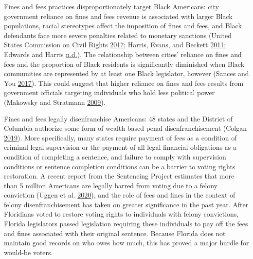 \documentclass[
  12pt,
]{article}
\begin{document}
Fines and fees practices disproportionately target Black Americans: city government reliance on fines and fees revenue is associated with larger Black populations, racial stereotypes affect the imposition of fines and fees, and Black defendants face more severe penalties related to monetary sanctions (United States Commission on Civil Rights \protect\hyperlink{ref-UnitedStatesCommissiononCivilRights2017}{2017}; Harris, Evans, and Beckett \protect\hyperlink{ref-Harris2011}{2011}; Edwards and Harris \protect\hyperlink{ref-Edwards2020}{n.d.}). The relationship between cities' reliance on fines and fees and the proportion of Black residents is significantly diminished when Black communities are represented by at least one Black legislator, however (Sances and You \protect\hyperlink{ref-Sances2017}{2017}). This could suggest that higher reliance on fines and fees results from government officials targeting individuals who hold less political power (Makowsky and Stratmann \protect\hyperlink{ref-Makowsky2009}{2009}).

Fines and fees legally disenfranchise Americans: 48 states and the District of Columbia authorize some form of wealth-based penal disenfranchisement (Colgan \protect\hyperlink{ref-Colgan2019}{2019}). More specifically, many states require payment of fees as a condition of criminal legal supervision or the payment of all legal financial obligations as a condition of completing a sentence, and failure to comply with supervision conditions or sentence completion conditions can be a barrier to voting rights restoration. A recent report from the Sentencing Project estimates that more than 5 million Americans are legally barred from voting due to a felony conviction (Uggen et al. \protect\hyperlink{ref-Uggen2020}{2020}), and the role of fees and fines in the context of felony disenfranchisement has taken on greater significance in the past year. After Floridians voted to restore voting rights to individuals with felony convictions, Florida legislators passed legislation requiring these individuals to pay off the fees and fines associated with their original sentence. Because Florida does not maintain good records on who owes how much, this has proved a major hurdle for would-be voters.
\end{document}
